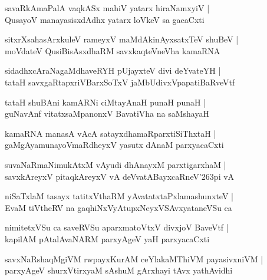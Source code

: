 \documentclass[twoside,12pt,openright]{book}
\def\S{\char'263}
\newcounter{shloka}[chapter]
\begin{document}
\begin{shloka}
savaRkAmaPalA vaqkASx mahiV yatarx hiraNamxyiV |\\
QusayoV manayasisxdAdhx yatarx loVkeV sa gacaCxti 
\end{shloka}

\begin{shloka}
sitxrXsahasArxkuleV rameyxV maMdAkinAyxsatxTeV shuBeV |\\
moVdateV QusiBisAsxdhaRM savxkaqteVneVha kamaRNA
\end{shloka}

\begin{shloka}
sidadhxcAraNagaMdhaveRYH pUjayxteV divi deYvateYH |\\
tataH savxgaRtapxriVBarxSoTxV jaMbUdivxVpapatiBaRveVtf 
\end{shloka}

\begin{shloka}
tataH shuBAni kamARNi ciMtayAnaH punaH punaH |\\
guNavAnf vitatxsaMpanonxV BavatiVha na saMshayaH
\end{shloka}

\begin{shloka}
kamaRNA manasA vAcA satayxdhamaRparxtiSiThxtaH |\\
gaMgAyamunayoVmaRdheyxV yasutx dAnaM parxyacaCxti 
\end{shloka}

\begin{shloka}
suvaNaRmaNimukAtxM vAyudi dhAnayxM parxtigarxhaM |\\
savxkAreyxV pitaqkAreyxV vA deVvatABayxcaRneV\S pi vA 
\end{shloka}

\begin{shloka}
niSaTxlaM tasayx tatitxVthaRM yAvatatxtaPxlamashunxteV |\\
EvaM tiVtheRV na gaqhiNxVyAtupxNeyxVSAvxyataneVSu ca 
\end{shloka}

\begin{shloka}
nimitetxVSu ca saveRVSu aparxmatoVtxV divxjoV BaveVtf |\\
kapilAM pAtalAvaNARM parxyAgeV yaH parxyacaCxti 
\end{shloka}

\begin{shloka}
savxNaRshaqMgiVM rwpayxKurAM ceYlakaMThiVM payasivxniVM |\\
parxyAgeV shurxVtirxyaM sAshuM gArxhayi tAvx yathAvidhi 
\end{shloka}
\end{document}

